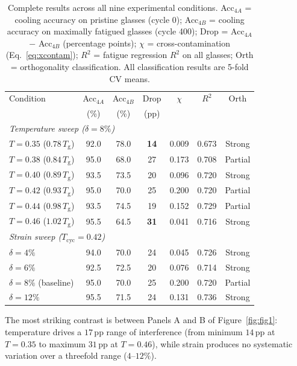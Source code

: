 \documentclass[12pt,a4paper]{article}
\newcommand{\Tg}{T_{\mathrm{g}}}
\newcommand{\Tbat}{T_{\mathrm{cyc}}}
\newcommand{\degpp}{\,\text{pp}}
\newcommand{\xcontam}{\chi}
\begin{document}
\begin{table}[htbp]
\centering
\caption{Complete results across all nine experimental conditions. Acc$_{4A}$ = cooling accuracy on pristine glasses (cycle 0); Acc$_{4B}$ = cooling accuracy on maximally fatigued glasses (cycle 400); Drop = Acc$_{4A}$ $-$ Acc$_{4B}$ (percentage points); $\xcontam$ = cross-contamination (Eq.~\ref{eq:xcontam}); $R^2$ = fatigue regression $R^2$ on all glasses; Orth = orthogonality classification. All classification results are 5-fold CV means.}
\label{tab:allresults}
\begin{tabular}{lcccccc}
\toprule
Condition & Acc$_{4A}$ & Acc$_{4B}$ & Drop & $\xcontam$ & $R^2$ & Orth \\
          & (\%) & (\%) & (pp) & & & \\
\midrule
\multicolumn{7}{l}{\textit{Temperature sweep ($\delta = 8\%$)}} \\
$T = 0.35$ ($0.78\,\Tg$) & 92.0 & 78.0 & \textbf{14} & 0.009 & 0.673 & Strong \\
$T = 0.38$ ($0.84\,\Tg$) & 95.0 & 68.0 & 27 & 0.173 & 0.708 & Partial \\
$T = 0.40$ ($0.89\,\Tg$) & 93.5 & 73.5 & 20 & 0.096 & 0.720 & Strong \\
$T = 0.42$ ($0.93\,\Tg$) & 95.0 & 70.0 & 25 & 0.200 & 0.720 & Partial \\
$T = 0.44$ ($0.98\,\Tg$) & 93.5 & 74.5 & 19 & 0.152 & 0.729 & Partial \\
$T = 0.46$ ($1.02\,\Tg$) & 95.5 & 64.5 & \textbf{31} & 0.041 & 0.716 & Strong \\
\midrule
\multicolumn{7}{l}{\textit{Strain sweep ($\Tbat = 0.42$)}} \\
$\delta = 4\%$ & 94.0 & 70.0 & 24 & 0.045 & 0.726 & Strong \\
$\delta = 6\%$ & 92.5 & 72.5 & 20 & 0.076 & 0.714 & Strong \\
$\delta = 8\%$ (baseline) & 95.0 & 70.0 & 25 & 0.200 & 0.720 & Partial \\
$\delta = 12\%$ & 95.5 & 71.5 & 24 & 0.131 & 0.736 & Strong \\
\bottomrule
\end{tabular}
\end{table}

The most striking contrast is between Panels A and B of Figure~\ref{fig:fig1}: temperature drives a $17\degpp$ range of interference (from minimum $14\degpp$ at $T=0.35$ to maximum $31\degpp$ at $T=0.46$), while strain produces no systematic variation over a threefold range ($4$--$12\%$).
\end{document}
